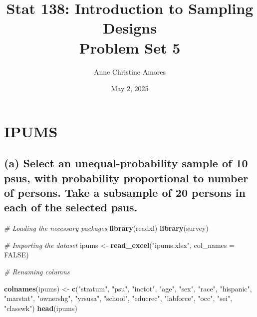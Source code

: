 \documentclass[]{article}
\author{}
\date{\vspace{-2.5em}}
\title{Stat 138: Introduction to Sampling Designs \\ Problem Set 5}
\author{Anne Christine Amores}
\date{May 2, 2025}
\newenvironment{Shaded}{\begin{snugshade}}{\end{snugshade}}
\newcommand{\AttributeTok}[1]{\textcolor[rgb]{0.13,0.29,0.53}{#1}}
\newcommand{\CommentTok}[1]{\textcolor[rgb]{0.56,0.35,0.01}{\textit{#1}}}
\newcommand{\ConstantTok}[1]{\textcolor[rgb]{0.56,0.35,0.01}{#1}}
\newcommand{\FunctionTok}[1]{\textcolor[rgb]{0.13,0.29,0.53}{\textbf{#1}}}
\newcommand{\NormalTok}[1]{#1}
\newcommand{\OtherTok}[1]{\textcolor[rgb]{0.56,0.35,0.01}{#1}}
\newcommand{\StringTok}[1]{\textcolor[rgb]{0.31,0.60,0.02}{#1}}
\begin{document}
\maketitle

\section{IPUMS}\label{ipums}

\subsection{(a) Select an unequal-probability sample of 10 psus, with
probability proportional to number of persons. Take a subsample of 20
persons in each of the selected
psus.}\label{a-select-an-unequal-probability-sample-of-10-psus-with-probability-proportional-to-number-of-persons.-take-a-subsample-of-20-persons-in-each-of-the-selected-psus.}

\begin{Shaded}
\begin{Highlighting}[]
\CommentTok{\# Loading the necessary packages}
\FunctionTok{library}\NormalTok{(readxl)}
\FunctionTok{library}\NormalTok{(survey)}
\end{Highlighting}
\end{Shaded}


\begin{Shaded}
\begin{Highlighting}[]
\CommentTok{\# Importing the dataset}
\NormalTok{ipums }\OtherTok{\textless{}{-}} \FunctionTok{read\_excel}\NormalTok{(}\StringTok{"ipums.xlsx"}\NormalTok{, }\AttributeTok{col\_names =} \ConstantTok{FALSE}\NormalTok{)}
\end{Highlighting}
\end{Shaded}

\begin{Shaded}
\begin{Highlighting}[]
\CommentTok{\# Renaming columns}

\FunctionTok{colnames}\NormalTok{(ipums) }\OtherTok{\textless{}{-}} \FunctionTok{c}\NormalTok{(}\StringTok{"stratum"}\NormalTok{, }\StringTok{"psu"}\NormalTok{, }\StringTok{"inctot"}\NormalTok{, }\StringTok{"age"}\NormalTok{, }\StringTok{"sex"}\NormalTok{, }\StringTok{"race"}\NormalTok{, }
                     \StringTok{"hispanic"}\NormalTok{, }\StringTok{"marstat"}\NormalTok{, }\StringTok{"ownershg"}\NormalTok{, }\StringTok{"yrsusa"}\NormalTok{, }\StringTok{"school"}\NormalTok{, }
                     \StringTok{"educrec"}\NormalTok{, }\StringTok{"labforce"}\NormalTok{, }\StringTok{"occ"}\NormalTok{, }\StringTok{"sei"}\NormalTok{, }\StringTok{"classwk"}\NormalTok{)}
\FunctionTok{head}\NormalTok{(ipums)}
\end{Highlighting}
\end{Shaded}
\end{document}
